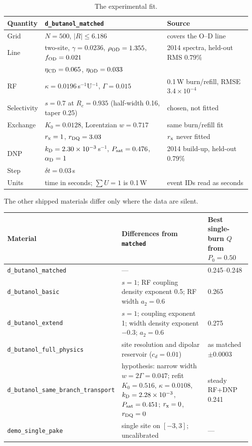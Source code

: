 \documentclass[11pt]{article}
\newcommand{\code}[1]{\texttt{#1}}
\begin{document}
\begin{table}[h]
\centering\small
\begin{tabular}{lll}
\toprule
Quantity & \code{d\_butanol\_matched} & Source \\
\midrule
Grid & \(N=500\), \(|R|\le6.186\) & covers the O--D line \\
Line & two-site, \(\gamma=0.0236\), \(\rho_{\rm OD}=1.355\), \(f_{\rm OD}=0.021\) & 2014 spectra, held-out RMS 0.79\% \\
& \(\eta_{\rm CD}=0.065\), \(\eta_{\rm OD}=0.033\) & \\
RF & \(\kappa=0.0196\)\,s\(^{-1}\)U\(^{-1}\), \(\Gamma=0.015\) & 0.1\,W burn/refill, RMSE \(3.4\times10^{-4}\) \\
Selectivity & \(s=0.7\) at \(R_c=0.935\) (half-width 0.16, taper 0.25) & chosen, not fitted \\
Exchange & \(K_0=0.0128\), Lorentzian \(w=0.717\) & same burn/refill fit \\
& \(r_{\rm x}=1\), \(r_{\rm DQ}=3.03\) & \(r_{\rm x}\) never fitted \\
DNP & \(k_{\rm D}=2.30\times10^{-3}\)\,s\(^{-1}\), \(P_{\rm sat}=0.476\), \(\alpha_{\rm D}=1\) & 2014 build-up, held-out 0.79\% \\
Step & \(\delta t=0.03\)\,s & \\
Units & time in seconds; \(\sum U=1\) is 0.1\,W & event IDs read as seconds \\
\bottomrule
\end{tabular}
\caption{The experimental fit.}
\label{tab:materials}
\end{table}

The other shipped materials differ only where the data are silent.

\begin{longtable}{L{0.28\textwidth} L{0.40\textwidth} L{0.24\textwidth}}
\toprule
Material & Differences from \code{matched} & Best single-burn \(Q\) from \(P_0=0.50\)\\
\midrule
\code{d\_butanol\_matched} & --- & 0.245--0.248 \\
\code{d\_butanol\_basic} & \(s=1\); RF coupling density exponent 0.5; RF width \(a_2=0.6\) & 0.265 \\
\code{d\_butanol\_extend} & \(s=1\); coupling exponent 1; width density exponent \(-0.3\); \(a_2=0.6\) & 0.275 \\
\code{d\_butanol\_full\_physics} & site resolution and dipolar reservoir (\(c_d=0.01\)) & as matched \(\pm0.0003\) \\
\code{d\_butanol\_same\_}\newline\code{branch\_transport} & hypothesis: narrow width \(w=2\Gamma=0.047\); refit \(K_0=0.516\), \(\kappa=0.0108\), \(k_{\rm D}=2.28\times10^{-3}\), \(P_{\rm sat}=0.451\); \(r_{\rm x}=0\), \(r_{\rm DQ}=0\) & steady RF+DNP 0.241 \\
\code{demo\_single\_pake} & single site on \([-3,3]\); uncalibrated & --- \\
\bottomrule
\end{longtable}
\end{document}
